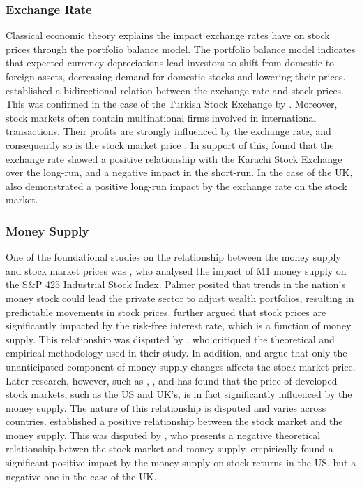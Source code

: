 \documentclass[11pt,a4paper]{article}
\newcommand{\citeboth}[1]{\citeauthor{#1} \citep{#1}}
\begin{document}
\subsubsection{Exchange Rate}

Classical economic theory explains the impact exchange rates have on stock prices through the portfolio balance model. The portfolio balance model indicates that expected currency depreciations lead investors to shift from domestic to foreign assets, decreasing demand for domestic stocks and lowering their prices. 
\citeboth{branson1977} established a bidirectional relation between the exchange rate and stock prices. This was confirmed
in the case of the Turkish Stock Exchange by \citeboth{aydemir2009}. 
Moreover, stock markets often contain multinational firms involved in international transactions. Their profits are strongly influenced by the exchange rate, and consequently so is the stock market price \citep{Wong2018}.
In support of this, \citeboth{khan2018} found that the exchange rate showed a positive relationship with the Karachi Stock Exchange over the long-run, and a negative impact in the short-run. 
In the case of the UK, \citeboth{wong2022} also demonstrated a positive long-run impact by the exchange rate on the stock market.

\subsubsection{Money Supply}

One of the foundational studies on the relationship between the money supply and 
stock market prices was \citeboth{palmer1970}, who analysed the impact of M1 money supply on the S$\&$P 425 Industrial Stock Index. 
Palmer posited that trends in the nation's money stock could lead the 
private sector to adjust wealth portfolios, resulting in 
predictable movements in stock prices. \citeboth{homa1971} further argued that 
stock prices are significantly impacted by the risk-free interest rate, 
which is a function of money supply. This relationship was disputed by \citeboth{pesando1974}, 
who critiqued the theoretical and empirical methodology used in their study. In addition, \citeboth{sorensen1982} and 
\citeboth{bernanke2005} argue that only the unanticipated component of money supply changes 
affects the stock market price. Later research, however, such as \citeboth{bahloul2017}, 
\citeboth{synek2024}, and \citeboth{pícha2017} has found that the price of developed stock markets, such as the US and UK's, is in fact significantly influenced by the money supply. 
The nature of this relationship is disputed and varies across countries. \citeboth{homa1971} established a positive relationship between the 
stock market and the money supply. This was disputed by \citeboth{sellin2001}, who presents a negative theoretical relationship betwen the stock market and money supply. \citeboth{olawale2014} empirically found a significant positive impact by the money supply on stock returns in the US, but a negative one in the case of the UK. 
\end{document}

